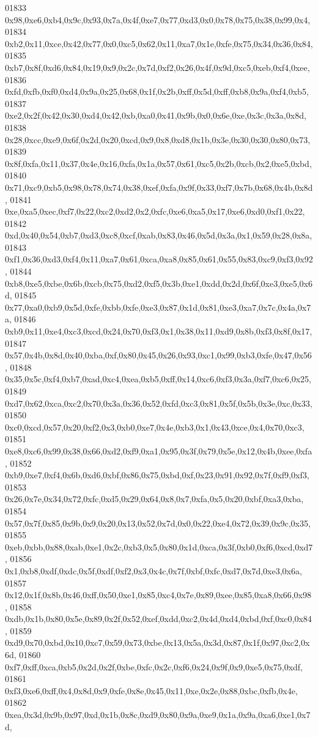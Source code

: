 \begin{DoxyCode}
01833   0x98,0xe6,0xb4,0x9c,0x93,0x7a,0x4f,0xe7,0x77,0xd3,0x0,0x78,0x75,0x38,0x99,0x4,
01834   0xb2,0x11,0xce,0x42,0x77,0x0,0xc5,0x62,0x11,0xa7,0x1e,0xfe,0x75,0x34,0x36,0x84,
01835   0xb7,0x8f,0xd6,0x84,0x19,0x9,0x2c,0x7d,0xf2,0x26,0x4f,0x9d,0xc5,0xeb,0xf4,0xee,
01836   0xfd,0xfb,0xf0,0xd4,0x9a,0x25,0x68,0x1f,0x2b,0xff,0x5d,0xff,0xb8,0x9a,0xf4,0xb5,
01837   0xe2,0x2f,0x42,0x30,0xd4,0x42,0xb,0xa0,0x41,0x9b,0x0,0x6e,0xe,0x3c,0x3a,0x8d,
01838   0x28,0xcc,0xe9,0x6f,0x2d,0x20,0xcd,0x9,0x8,0xd8,0x1b,0x3e,0x30,0x30,0x80,0x73,
01839   0x8f,0xfa,0x11,0x37,0x4e,0x16,0xfa,0x1a,0x57,0x61,0xc5,0x2b,0xcb,0x2,0xe5,0xbd,
01840   0x71,0xc9,0xb5,0x98,0x78,0x74,0x38,0xef,0xfa,0x9f,0x33,0xf7,0x7b,0x68,0x4b,0x8d,
01841   0xe,0xa5,0xec,0xf7,0x22,0xc2,0xd2,0x2,0xfc,0xe6,0xa5,0x17,0xe6,0xd0,0xf1,0x22,
01842   0xd,0x40,0x54,0xb7,0xd3,0xc8,0xcf,0xab,0x83,0x46,0x5d,0x3a,0x1,0x59,0x28,0x8a,
01843   0xf1,0x36,0xd3,0xf4,0x11,0xa7,0x61,0xca,0xa8,0x85,0x61,0x55,0x83,0xc9,0xf3,0x92,
01844   0xb8,0xe5,0xbe,0x6b,0xcb,0x75,0xd2,0xf5,0x3b,0xe1,0xdd,0x2d,0x6f,0xe3,0xe5,0x6d,
01845   0x77,0xa0,0xb9,0x5d,0xfe,0xbb,0xfe,0xe3,0x87,0x1d,0x81,0xe3,0xa7,0x7c,0x4a,0x7a,
01846   0xb9,0x11,0xe4,0xc3,0xcd,0x24,0x70,0xf3,0x1,0x38,0x11,0xd9,0x8b,0xf3,0x8f,0x17,
01847   0x57,0x4b,0x8d,0x40,0xba,0xf,0x80,0x45,0x26,0x93,0xc1,0x99,0xb3,0xfe,0x47,0x56,
01848   0x35,0x5c,0xf4,0xb7,0xad,0xc4,0xea,0xb5,0xff,0x14,0xc6,0xf3,0x3a,0xf7,0xc6,0x25,
01849   0xd7,0x62,0xca,0xc2,0x70,0x3a,0x36,0x52,0xfd,0xc3,0x81,0x5f,0x5b,0x3e,0xc,0x33,
01850   0xc0,0xcd,0x57,0x20,0xf2,0x3,0xb0,0xe7,0x4e,0xb3,0x1,0x43,0xce,0x4,0x70,0xc3,
01851   0xe8,0xc6,0x99,0x38,0x66,0xd2,0xf9,0xa1,0x95,0x3f,0x79,0x5e,0x12,0x4b,0xee,0xfa,
01852   0xb9,0xe7,0xf4,0x6b,0xd6,0xbf,0x86,0x75,0xbd,0xf,0x23,0x91,0x92,0x7f,0xf9,0xf3,
01853   0x26,0x7e,0x34,0x72,0xfc,0xd5,0x29,0x64,0x8,0x7,0xfa,0x5,0x20,0xbf,0xa3,0xba,
01854   0x57,0x7f,0x85,0x9b,0x9,0x20,0x13,0x52,0x7d,0x0,0x22,0xe4,0x72,0x39,0x9c,0x35,
01855   0xeb,0xbb,0x88,0xab,0xe1,0x2c,0xb3,0x5,0x80,0x1d,0xca,0x3f,0xb0,0xf6,0xcd,0xd7,
01856   0x1,0xb8,0xdf,0xdc,0x5f,0xdf,0xf2,0x3,0x4c,0x7f,0xbf,0xfc,0xd7,0x7d,0xe3,0x6a,
01857   0x12,0x1f,0x8b,0x46,0xff,0x50,0xe1,0x85,0xc4,0x7e,0x89,0xee,0x85,0xa8,0x66,0x98,
01858   0xdb,0x1b,0x80,0x5e,0x89,0x2f,0x52,0xef,0xdd,0xc2,0x4d,0xd4,0xbd,0xf,0xc0,0x84,
01859   0xd9,0x70,0xbd,0x10,0xc7,0x59,0x73,0xbe,0x13,0x5a,0x3d,0x87,0x1f,0x97,0xc2,0x6d,
01860   0xf7,0xff,0xca,0xb5,0x2d,0x2f,0xbe,0xfc,0x2c,0xf6,0x24,0x9f,0x9,0xe5,0x75,0xdf,
01861   0xf3,0xe6,0xff,0x4,0x8d,0x9,0xfe,0x8e,0x45,0x11,0xe,0x2e,0x88,0xbc,0xfb,0x4e,
01862   0xea,0x3d,0x9b,0x97,0xd,0x1b,0x8c,0xd9,0x80,0x9a,0xe9,0x1a,0x9a,0xa6,0xe1,0x7d,

\end{DoxyCode}
